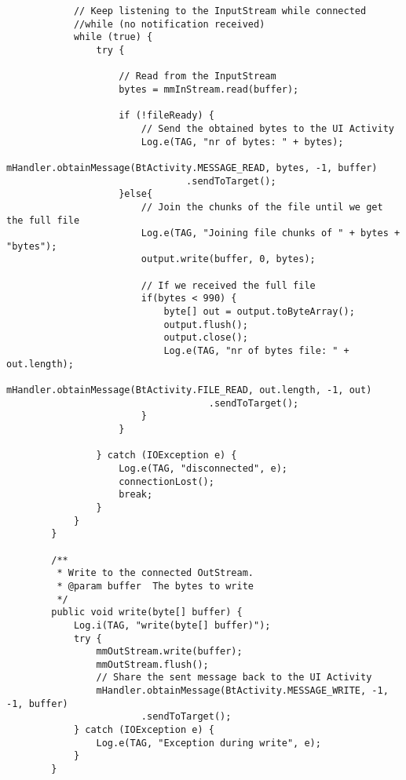 \begin{verbatim}
            // Keep listening to the InputStream while connected
            //while (no notification received)
            while (true) {
                try {

                    // Read from the InputStream
                    bytes = mmInStream.read(buffer);

                    if (!fileReady) {
                        // Send the obtained bytes to the UI Activity
                        Log.e(TAG, "nr of bytes: " + bytes);
                        mHandler.obtainMessage(BtActivity.MESSAGE_READ, bytes, -1, buffer)
                                .sendToTarget();
                    }else{
                        // Join the chunks of the file until we get the full file
                        Log.e(TAG, "Joining file chunks of " + bytes + "bytes");
                        output.write(buffer, 0, bytes);

                        // If we received the full file
                        if(bytes < 990) {
                            byte[] out = output.toByteArray();
                            output.flush();
                            output.close();
                            Log.e(TAG, "nr of bytes file: " + out.length);
                            mHandler.obtainMessage(BtActivity.FILE_READ, out.length, -1, out)
                                    .sendToTarget();
                        }
                    }

                } catch (IOException e) {
                    Log.e(TAG, "disconnected", e);
                    connectionLost();
                    break;
                }
            }
        }

        /**
         * Write to the connected OutStream.
         * @param buffer  The bytes to write
         */
        public void write(byte[] buffer) {
            Log.i(TAG, "write(byte[] buffer)");
            try {
                mmOutStream.write(buffer);
                mmOutStream.flush();
                // Share the sent message back to the UI Activity
                mHandler.obtainMessage(BtActivity.MESSAGE_WRITE, -1, -1, buffer)
                        .sendToTarget();
            } catch (IOException e) {
                Log.e(TAG, "Exception during write", e);
            }
        }


\end{verbatim}
